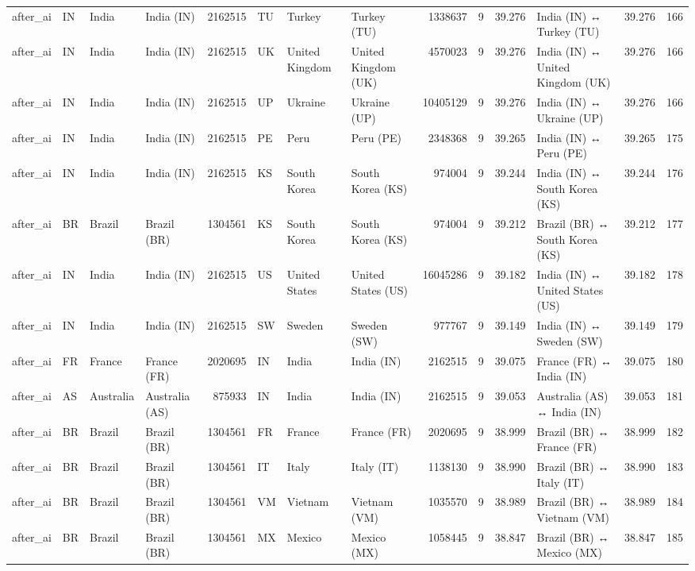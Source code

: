 \begin{tabular}{llllrlllrrrlrr}
after\_ai & IN & India & India (IN) & 2162515 & TU & Turkey & Turkey (TU) & 1338637 & 9 & 39.276 & India (IN) ↔ Turkey (TU) & 39.276 & 166 \\
after\_ai & IN & India & India (IN) & 2162515 & UK & United Kingdom & United Kingdom (UK) & 4570023 & 9 & 39.276 & India (IN) ↔ United Kingdom (UK) & 39.276 & 166 \\
after\_ai & IN & India & India (IN) & 2162515 & UP & Ukraine & Ukraine (UP) & 10405129 & 9 & 39.276 & India (IN) ↔ Ukraine (UP) & 39.276 & 166 \\
after\_ai & IN & India & India (IN) & 2162515 & PE & Peru & Peru (PE) & 2348368 & 9 & 39.265 & India (IN) ↔ Peru (PE) & 39.265 & 175 \\
after\_ai & IN & India & India (IN) & 2162515 & KS & South Korea & South Korea (KS) & 974004 & 9 & 39.244 & India (IN) ↔ South Korea (KS) & 39.244 & 176 \\
after\_ai & BR & Brazil & Brazil (BR) & 1304561 & KS & South Korea & South Korea (KS) & 974004 & 9 & 39.212 & Brazil (BR) ↔ South Korea (KS) & 39.212 & 177 \\
after\_ai & IN & India & India (IN) & 2162515 & US & United States & United States (US) & 16045286 & 9 & 39.182 & India (IN) ↔ United States (US) & 39.182 & 178 \\
after\_ai & IN & India & India (IN) & 2162515 & SW & Sweden & Sweden (SW) & 977767 & 9 & 39.149 & India (IN) ↔ Sweden (SW) & 39.149 & 179 \\
after\_ai & FR & France & France (FR) & 2020695 & IN & India & India (IN) & 2162515 & 9 & 39.075 & France (FR) ↔ India (IN) & 39.075 & 180 \\
after\_ai & AS & Australia & Australia (AS) & 875933 & IN & India & India (IN) & 2162515 & 9 & 39.053 & Australia (AS) ↔ India (IN) & 39.053 & 181 \\
after\_ai & BR & Brazil & Brazil (BR) & 1304561 & FR & France & France (FR) & 2020695 & 9 & 38.999 & Brazil (BR) ↔ France (FR) & 38.999 & 182 \\
after\_ai & BR & Brazil & Brazil (BR) & 1304561 & IT & Italy & Italy (IT) & 1138130 & 9 & 38.990 & Brazil (BR) ↔ Italy (IT) & 38.990 & 183 \\
after\_ai & BR & Brazil & Brazil (BR) & 1304561 & VM & Vietnam & Vietnam (VM) & 1035570 & 9 & 38.989 & Brazil (BR) ↔ Vietnam (VM) & 38.989 & 184 \\
after\_ai & BR & Brazil & Brazil (BR) & 1304561 & MX & Mexico & Mexico (MX) & 1058445 & 9 & 38.847 & Brazil (BR) ↔ Mexico (MX) & 38.847 & 185 \\

\end{tabular}
